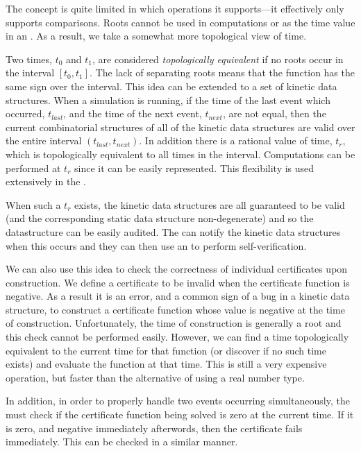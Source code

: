 The  concept is quite limited in which operations it supports---it
effectively only supports comparisons.  Roots cannot be used
in computations or as the time value in an . As a result, we take
a somewhat more topological view of time. 

Two times, $t_0$ and $t_1$, are considered \textit{topologically
equivalent} if no roots occur in the interval $[t_0,t_1]$. The lack of
separating roots means that the function has the same sign over the
interval. This idea can be extended to a set of kinetic data
structures. When a simulation is running, if the time of the last event
which occurred, $t_{last}$, and the time of the next event,
$t_{next}$, are not equal, then the current combinatorial structures of
all of the kinetic data structures are valid over the entire interval
$(t_{last},t_{next})$. In addition there is a rational value of time,
$t_r$, which is topologically equivalent to all times in the
interval. Computations can be performed at $t_r$ since it can be
easily represented. This flexibility is used extensively in the .

When such a $t_r$ exists, the kinetic data structures are all
guaranteed to be valid (and the corresponding static data structure
non-degenerate) and so the datastructure can be easily audited. The  can
notify the kinetic data structures when this occurs and they can then
use an  to perform self-verification.

We can also use this idea to check the correctness of individual
certificates upon construction. We define a certificate to be invalid
when the certificate function is negative. As a result it
is an error, and a common sign of a bug in a kinetic data structure,
to construct a certificate function whose value is negative at the
time of construction. 
%
Unfortunately, the time of construction is
generally a root and this check cannot be performed easily. However,
we can find a time topologically equivalent to the current time for
that function (or discover if no such time exists) and evaluate the
function at that time. This is still a very expensive operation, but
faster than the alternative of using a real number type.

In addition, in order to properly handle two events occurring
simultaneously, the  must check if the certificate function
being solved is zero at the current time. If it is zero, and negative
immediately afterwords, then the certificate fails immediately. This
can be checked in a similar manner.

